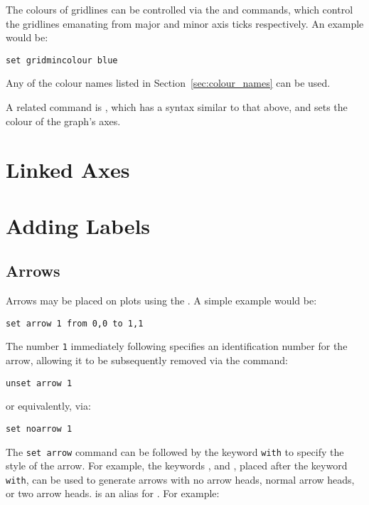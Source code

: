 The colours of gridlines can be
controlled via the  and  commands, which control the gridlines emanating from major and
minor axis ticks respectively. An example would be:

\begin{verbatim}
set gridmincolour blue
\end{verbatim}

\noindent Any of the colour names listed in Section~\ref{sec:colour_names} can
be used.

A related command is , which has a syntax similar to that above, and sets the colour of
the graph's axes.\label{sec:set_colours}

\section{Linked Axes}

\section{Adding Labels}

\subsection{Arrows}

\label{sec:set_arrow} Arrows may be placed on plots using the
. A simple example would be:

\begin{verbatim}
set arrow 1 from 0,0 to 1,1
\end{verbatim}

\noindent The number {\tt 1} immediately following 
specifies an identification number for the arrow, allowing it to be
subsequently removed via the command:

\begin{verbatim}
unset arrow 1
\end{verbatim}

\noindent or equivalently, via:

\begin{verbatim}
set noarrow 1
\end{verbatim}

The {\tt set arrow} command can be followed by the keyword {\tt with} to
specify the style of the arrow. For example, the keywords ,
 and , placed after the keyword {\tt with}, can
be used to generate arrows with no arrow heads, normal arrow heads, or two
arrow heads.   is an alias for .  For example:

